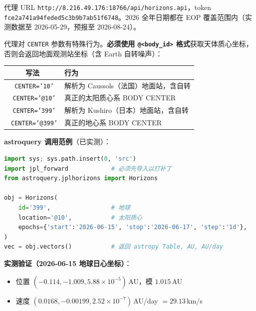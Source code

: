 \documentclass[11pt,a4paper]{ctexart}
\newcommand{\cmark}{\textcolor{green!55!black}{\ding{51}}}
\newcommand{\xmark}{\textcolor{warn}{\ding{55}}}
\begin{document}
\begin{notebox}[代理可用性]
代理 URL \texttt{http://8.216.49.176:18766/api/horizons.api}，token \texttt{fce2a741a94feded5c3b9b7ab51f6748}。2026 全年日期都在 EOP 覆盖范围内（实测数据至 2026-05-29，预报至 2026-08-24）。
\end{notebox}

\begin{warnbox}
代理对 \texttt{CENTER} 参数有特殊行为。\textbf{必须使用 \texttt{@<body\_id>} 格式}获取天体质心坐标，否则会返回地面观测站坐标（含 Earth 自转噪声）：
\vspace{4pt}
\begin{center}
\small
\begin{tabular}{@{}cl@{}}
\toprule
写法 & 行为 \\
\midrule
\xmark\ \texttt{CENTER='10'}   & 解析为 Caussols（法国）地面站，含自转 \\
\cmark\ \texttt{CENTER='@10'}  & 真正的太阳质心系 BODY CENTER \\
\xmark\ \texttt{CENTER='399'}  & 解析为 Kushiro（日本）地面站，含自转 \\
\cmark\ \texttt{CENTER='@399'} & 真正的地心系 BODY CENTER \\
\bottomrule
\end{tabular}
\end{center}
\end{warnbox}

\textbf{astroquery 调用范例}（已实测）：

\begin{lstlisting}[language=Python]
import sys; sys.path.insert(0, 'src')
import jpl_forward            # 必须先导入以打补丁
from astroquery.jplhorizons import Horizons

obj = Horizons(
    id='399',                 # 地球
    location='@10',           # 太阳质心
    epochs={'start':'2026-06-15', 'stop':'2026-06-17', 'step':'1d'},
)
vec = obj.vectors()           # 返回 astropy Table, AU, AU/day
\end{lstlisting}

\textbf{实测验证（2026-06-15 地球日心坐标）}：

\begin{itemize}[leftmargin=*]
    \item 位置 $(-0.114, -1.009, 5.88\!\times\!10^{-5})$\,AU，模 $1.015$\,AU \cmark
    \item 速度 $(0.0168, -0.00199, 2.52\!\times\!10^{-7})$\,AU/day $=29.13$\,km/s \cmark
\end{itemize}
\end{document}
